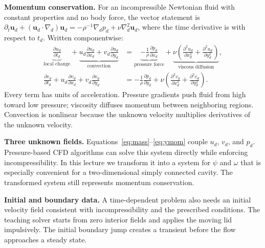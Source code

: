 \documentclass[11pt]{article}
\begin{document}
\textbf{Momentum conservation.} For an incompressible Newtonian fluid with constant properties and no body force, the vector statement is $\partial_t\boldsymbol{u}_d+(\boldsymbol{u}_d\cdot\nabla_d)\boldsymbol{u}_d=-\rho^{-1}\nabla_d p_d+\nu\nabla_d^2\boldsymbol{u}_d$, where the time derivative is with respect to $t_d$. Written componentwise:
\begin{align}
\underbrace{\frac{\partial u_d}{\partial t_d}}_{\text{local change}}+
\underbrace{u_d\frac{\partial u_d}{\partial x_d}+v_d\frac{\partial u_d}{\partial y_d}}_{\text{convection}}
&=\underbrace{-\frac{1}{\rho}\frac{\partial p_d}{\partial x_d}}_{\text{pressure force}}+
\underbrace{\nu\left(\frac{\partial^2u_d}{\partial x_d^2}+\frac{\partial^2u_d}{\partial y_d^2}\right)}_{\text{viscous diffusion}},\label{eq:xmom}\\
\frac{\partial v_d}{\partial t_d}+u_d\frac{\partial v_d}{\partial x_d}+v_d\frac{\partial v_d}{\partial y_d}
&=-\frac{1}{\rho}\frac{\partial p_d}{\partial y_d}+\nu\left(\frac{\partial^2v_d}{\partial x_d^2}+\frac{\partial^2v_d}{\partial y_d^2}\right).\label{eq:ymom}
\end{align}
Every term has units of acceleration. Pressure gradients push fluid from high toward low pressure; viscosity diffuses momentum between neighboring regions. Convection is nonlinear because the unknown velocity multiplies derivatives of the unknown velocity.

\textbf{Three unknown fields.} Equations~\eqref{eq:mass}--\eqref{eq:ymom} couple $u_d$, $v_d$, and $p_d$. Pressure-based CFD algorithms can solve this system directly while enforcing incompressibility. In this lecture we transform it into a system for $\psi$ and $\omega$ that is especially convenient for a two-dimensional simply connected cavity. The transformed system still represents momentum conservation.

\textbf{Initial and boundary data.} A time-dependent problem also needs an initial velocity field consistent with incompressibility and the prescribed conditions. The teaching solver starts from zero interior fields and applies the moving lid impulsively. The initial boundary jump creates a transient before the flow approaches a steady state.
\end{document}
